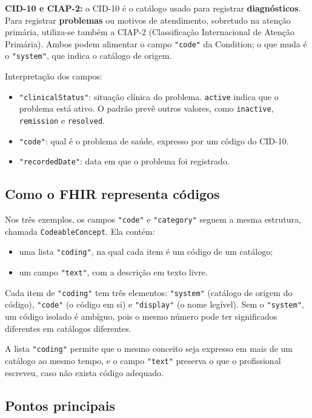 \documentclass[11pt,a4paper]{article}
\newcommand{\codigo}[1]{\texttt{#1}}
\begin{document}
\textbf{CID-10 e CIAP-2:} o CID-10 é o catálogo usado para registrar
\textbf{diagnósticos}. Para registrar \textbf{problemas} ou motivos de
atendimento, sobretudo na atenção primária, utiliza-se também a CIAP-2
(Classificação Internacional de Atenção Primária). Ambos podem alimentar o
campo \codigo{"code"} da Condition; o que muda é o \codigo{"system"}, que
indica o catálogo de origem.

Interpretação dos campos:

\begin{itemize}
  \item \codigo{"clinicalStatus"}: situação clínica do problema.
    \codigo{active} indica que o problema está ativo. O padrão prevê
    outros valores, como \codigo{inactive}, \codigo{remission} e
    \codigo{resolved}.
  \item \codigo{"code"}: qual é o problema de saúde, expresso por um
    código do CID-10.
  \item \codigo{"recordedDate"}: data em que o problema foi registrado.
\end{itemize}

\subsection{Como o FHIR representa códigos}

Nos três exemplos, os campos \codigo{"code"} e \codigo{"category"}
seguem a mesma estrutura, chamada \codigo{CodeableConcept}. Ela contém:

\begin{itemize}
  \item uma lista \codigo{"coding"}, na qual cada item é um código de um
    catálogo;
  \item um campo \codigo{"text"}, com a descrição em texto livre.
\end{itemize}

Cada item de \codigo{"coding"} tem três elementos: \codigo{"system"}
(catálogo de origem do código), \codigo{"code"} (o código em si) e
\codigo{"display"} (o nome legível). Sem o \codigo{"system"}, um código
isolado é ambíguo, pois o mesmo número pode ter significados diferentes em
catálogos diferentes.

A lista \codigo{"coding"} permite que o mesmo conceito seja expresso em
mais de um catálogo ao mesmo tempo, e o campo \codigo{"text"} preserva o
que o profissional escreveu, caso não exista código adequado.

\subsection*{Pontos principais}
\end{document}

